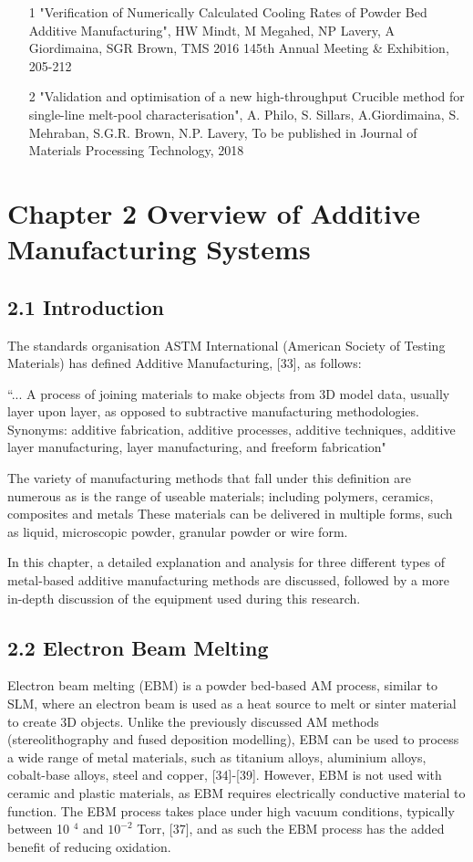 \documentclass[10pt]{article}
\begin{document}
\begin{itemize}
  \item [1] "Verification of Numerically Calculated Cooling Rates of Powder Bed Additive Manufacturing", HW Mindt, M Megahed, NP Lavery, A Giordimaina, SGR Brown, TMS 2016 145th Annual Meeting \& Exhibition, 205-212

  \item [2] "Validation and optimisation of a new high-throughput Crucible method for single-line melt-pool characterisation", A. Philo, S. Sillars, A.Giordimaina, S. Mehraban, S.G.R. Brown, N.P. Lavery, To be published in Journal of Materials Processing Technology, 2018

\end{itemize}

\section*{Chapter 2 Overview of Additive Manufacturing Systems}
\subsection*{2.1 Introduction}
The standards organisation ASTM International (American Society of Testing Materials) has defined Additive Manufacturing, [33], as follows:

“... A process of joining materials to make objects from 3D model data, usually layer upon layer, as opposed to subtractive manufacturing methodologies. Synonyms: additive fabrication, additive processes, additive techniques, additive layer manufacturing, layer manufacturing, and freeform fabrication"

The variety of manufacturing methods that fall under this definition are numerous as is the range of useable materials; including polymers, ceramics, composites and metals These materials can be delivered in multiple forms, such as liquid, microscopic powder, granular powder or wire form.

In this chapter, a detailed explanation and analysis for three different types of metal-based additive manufacturing methods are discussed, followed by a more in-depth discussion of the equipment used during this research.

\subsection*{2.2 Electron Beam Melting}
Electron beam melting (EBM) is a powder bed-based AM process, similar to SLM, where an electron beam is used as a heat source to melt or sinter material to create 3D objects. Unlike the previously discussed AM methods (stereolithography and fused deposition modelling), EBM can be used to process a wide range of metal materials, such as titanium alloys, aluminium alloys, cobalt-base alloys, steel and copper, [34]-[39]. However, EBM is not used with ceramic and plastic materials, as EBM requires electrically conductive material to function. The EBM process takes place under high vacuum conditions, typically between 10 ${ }^{4}$ and $10^{-2}$ Torr, [37], and as such the EBM process has the added benefit of reducing oxidation.
\end{document}
